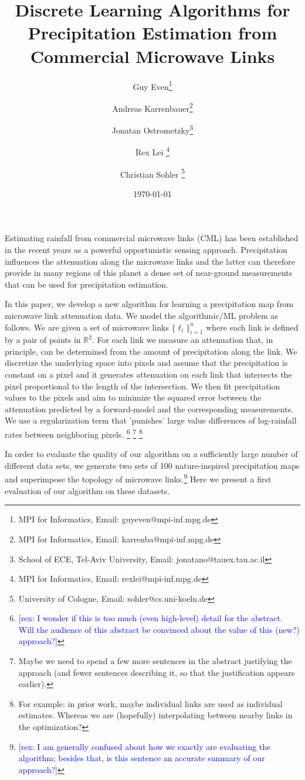 \documentclass{article}
\title{Discrete Learning Algorithms for Precipitation Estimation from Commercial Microwave Links}
\author{Guy Even\thanks{MPI for Informatics, Email: guyeven@mpi-inf.mpg.de} 
\and
Andreas Karrenbauer\thanks{MPI for Informatics, Email: karrenba@mpi-inf.mpg.de}
\and Jonatan Ostrometzky\thanks{School of ECE, Tel-Aviv University, Email: jonatano@tauex.tau.ac.il}
\and Rex Lei \thanks{MPI for Informatics, Email: rexlei@mpi-inf.mpg.de}
\and Christian Sohler \thanks{University of Cologne, Email: sohler@cs.uni-koeln.de}}
\date{\today}
\newcommand{\rex}[1]{\textcolor{blue}{[rex: #1]}}
\begin{document}
\maketitle

Estimating rainfall from commercial microwave links (CML) has been established in the recent years as a powerful opportunistic sensing approach. Precipitation influences the attenuation along the microwave links and the latter can therefore provide  in many regions of this planet a dense set of near-ground measurements that can be used for precipitation estimation.

In this paper, we develop a new algorithm for learning a precipitation map 
from microwave link attenuation data. We model the algorithmic/ML problem as follows. We are given a set of microwave links
$\{\ell_i\}_{i=1}^n$ where each link is defined by a pair of points in $\mathbb{R}^2$. For each link we measure an attenuation that, in principle, can be determined from the amount of precipitation along the link.
We discretize the underlying space into pixels and assume that the precipitation is constant on a pixel and it generates attenuation on each link that intersects the pixel proportional to the length of the intersection. We then fit precipitation values to the pixels and aim to minimize the squared error between the attenuation predicted by a forward-model and the corresponding measurements. We use a regularization term that 'punishes' large value differences of log-rainfall rates between neighboring pixels. 
\footnote{\rex{I wonder if this is too much (even high-level) detail for the abstract. Will the audience of this abstract be convinced about the value of this (new?) approach?}} 
\footnote{Maybe we need to spend a few more sentences in the abstract justifying the approach (and fewer sentences describing it, so that the justification appears earlier).}
\footnote{
For example: in prior work, maybe individual links are used as individual estimates. Whereas we are (hopefully) interpolating between nearby links in the optimization?}

In order to evaluate the quality of our algorithm on a sufficiently large number of different data sets, we generate two sets of 100 nature-inspired precipitation maps and superimpose the topology of microwave links.\footnote{\rex{I am generally confused about how we exactly are evaluating the algorithm; besides that, is this sentence an accurate summary of our approach?}} Here we present a first evaluation of our algorithm on these datasets.
\end{document}
